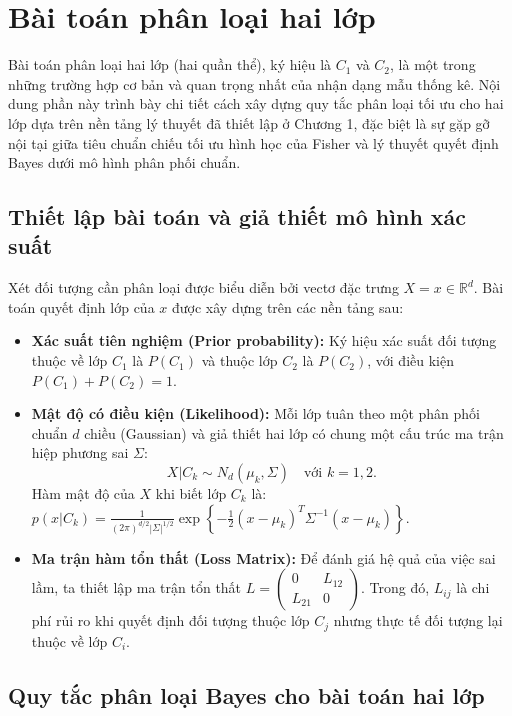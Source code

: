 \section{Bài toán phân loại hai lớp}

Bài toán phân loại hai lớp (hai quần thể), ký hiệu là $C_1$ và $C_2$, là một trong những trường hợp cơ bản và quan trọng nhất của nhận dạng mẫu thống kê. Nội dung phần này trình bày chi tiết cách xây dựng quy tắc phân loại tối ưu cho hai lớp dựa trên nền tảng lý thuyết đã thiết lập ở Chương 1, đặc biệt là sự gặp gỡ nội tại giữa tiêu chuẩn chiếu tối ưu hình học của Fisher và lý thuyết quyết định Bayes dưới mô hình phân phối chuẩn.

\subsection{Thiết lập bài toán và giả thiết mô hình xác suất}

Xét đối tượng cần phân loại được biểu diễn bởi vectơ đặc trưng $X = x \in \mathbb{R}^d$. Bài toán quyết định lớp của $x$ được xây dựng trên các nền tảng sau:
\begin{itemize}
    \item \textbf{Xác suất tiên nghiệm (Prior probability):} Ký hiệu xác suất đối tượng thuộc về lớp $C_1$ là $P(C_1)$ và thuộc lớp $C_2$ là $P(C_2)$, với điều kiện $P(C_1) + P(C_2) = 1$.
    \item \textbf{Mật độ có điều kiện (Likelihood):} Mỗi lớp tuân theo một phân phối chuẩn $d$ chiều (Gaussian) và giả thiết hai lớp có chung một cấu trúc ma trận hiệp phương sai $\Sigma$:
    \begin{equation}
        X | C_k \sim N_d(\mu_k, \Sigma) \quad \text{với } k = 1, 2.
    \end{equation}
    Hàm mật độ của $X$ khi biết lớp $C_k$ là: $p(x | C_k) = \frac{1}{(2\pi)^{d/2} |\Sigma|^{1/2}} \exp\left\{ -\frac{1}{2}(x - \mu_k)^T \Sigma^{-1} (x - \mu_k) \right\}$.
    \item \textbf{Ma trận hàm tổn thất (Loss Matrix):} Để đánh giá hệ quả của việc sai lầm, ta thiết lập ma trận tổn thất $L = \begin{pmatrix} 0 & L_{12} \\ L_{21} & 0 \end{pmatrix}$. Trong đó, $L_{ij}$ là chi phí rủi ro khi quyết định đối tượng thuộc lớp $C_j$ nhưng thực tế đối tượng lại thuộc về lớp $C_i$.
\end{itemize}

\subsection{Quy tắc phân loại Bayes cho bài toán hai lớp}

